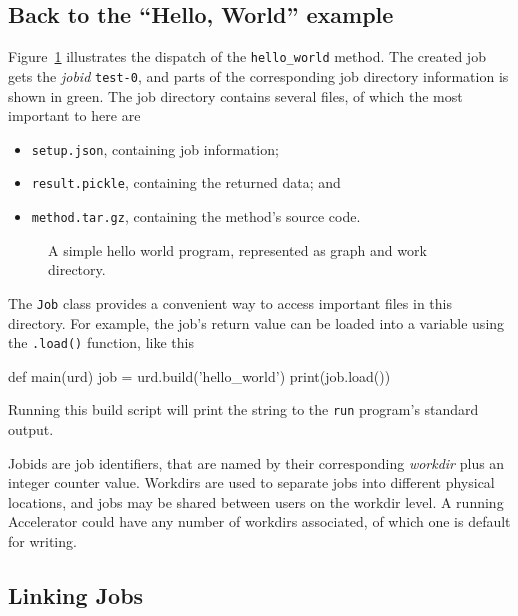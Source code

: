 \subsection{Back to the ``Hello, World'' example}
Figure~\ref{fig:execflow-hello-world} illustrates the dispatch of the
\texttt{hello\_world} method.  The created job gets the \textsl{jobid}
\texttt{test-0}, and parts of the corresponding job directory
information is shown in green.  The job directory contains several
files, of which the most important to here are
\begin{itemize}
\item[] \texttt{setup.json}, containing job information;
\item[] \texttt{result.pickle}, containing the returned data; and
\item[] \texttt{method.tar.gz}, containing the method's source code.
\end{itemize}

\begin{figure}[h!]
  \begin{center}
    
    \caption{A simple hello world program, represented as graph and
      work directory.}
    \label{fig:execflow-hello-world}
  \end{center}
\end{figure}

The \texttt{Job} class provides a convenient way to access important
files in this directory.  For example, the job's return value can be
loaded into a variable using the \texttt{.load()} function, like this
\begin{python}
def main(urd)
    job = urd.build('hello_world')
    print(job.load())
\end{python}
Running this build script will print the string to the \texttt{run}
program's standard output.


Jobids are job identifiers, that are named by their corresponding
\textsl{workdir} plus an integer counter value.  Workdirs are used to
separate jobs into different physical locations, and jobs may be
shared between users on the workdir level.  A running Accelerator
could have any number of workdirs associated, of which one is default for writing.



\subsection{Linking Jobs}

